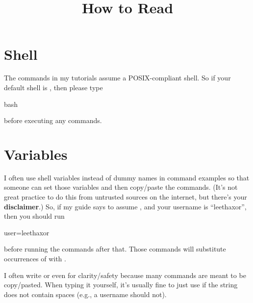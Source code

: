 
\title{How to Read}
\date{}



\section{Shell}
The commands in my tutorials assume a POSIX-compliant shell.
So if your default shell is , then please type
\begin{code}
bash
\end{code}
before executing any commands.

\section{Variables}
I often use shell variables instead of dummy names in command examples so that someone can set those variables and then copy/paste the commands.
(It's not great practice to do this from untrusted sources on the internet, but there's your \textbf{disclaimer}.)
So, if my guide says to assume , and your username is ``leethaxor'', then you should run
\begin{code}
user=leethaxor
\end{code}
before running the commands after that.
Those commands will substitute occurrences of  with .

I often write  or even  for clarity/safety because many commands are meant to be copy/pasted.
When typing it yourself, it's usually fine to just use  if the string does not contain spaces (e.g., a username should not).



